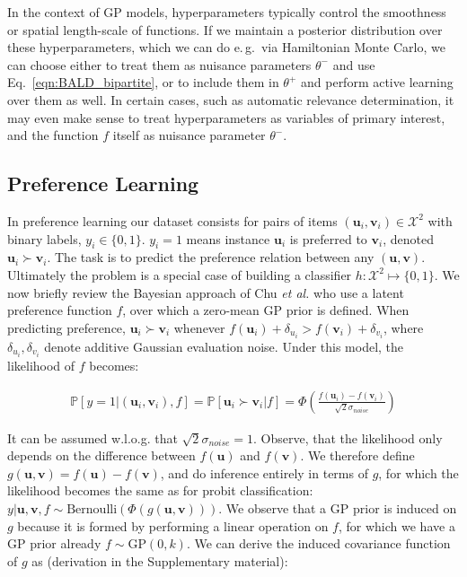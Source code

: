 \documentclass{article}
\newcommand{\upref}{\bm{u}}
\newcommand{\vpref}{\bm{v}}
\begin{document}
In the context of GP models, hyperparameters typically control the smoothness or spatial length-scale of functions. If we maintain a posterior distribution over these hyperparameters, which we can do e.\,g.\ via Hamiltonian Monte Carlo, we can choose either to treat them as nuisance parameters $\theta^-$ and use Eq.\ \ref{eqn:BALD_bipartite}, or to include them in $\theta^+$ and perform active learning over them as well. In certain cases, such as automatic relevance determination\cite{Rasmussen2006}, it may even make sense to treat hyperparameters as variables of primary interest, and the function $f$ itself as nuisance parameter $\theta^-$.

\subsection{Preference Learning}

In preference learning our dataset consists for pairs of items $(\upref_i,\vpref_i)\in\mathcal{X}^2$ with binary labels, $y_i\in\{0,1\}$. $y_i=1$ means instance $\upref_i$ is preferred to $\vpref_i$, denoted $\upref_i\succ \vpref_i$. The task is to predict the preference relation between any $(\upref,\vpref)$. Ultimately the problem is a special case of building a classifier $h:\mathcal{X}^2\mapsto\{0,1\}$. We now briefly review the Bayesian approach of Chu \emph{et al.} \cite{chu2005} who use a latent preference function $f$, over which a zero-mean GP prior is defined. When predicting preference,  $\upref_i \succ \vpref_i$ whenever $f(\upref_i)+\delta_{u_i}>f(\vpref_i)+\delta_{v_i}$, where $\delta_{u_i}, \delta_{v_i}$ denote additive Gaussian evaluation noise. Under this model, the likelihood of $f$ becomes:

\begin{align}
	\mathbb{P}[y=1\vert (\upref_i,\vpref_i), f] = \mathbb{P}[\upref_i\succ \vpref_i \vert f] =  \Phi\left(\frac{f(\upref_i) - f(\vpref_i)}{\sqrt{2}\sigma_{noise}}\right)
\end{align}

It can be assumed w.l.o.g. that $\sqrt{2}\sigma_{noise}=1$. Observe, that the likelihood only depends on the difference between $f(\upref)$ and $f(\vpref)$. We therefore define $g(\upref,\vpref)=f(\upref)-f(\vpref)$, and do inference entirely in terms of $g$, for which the likelihood becomes the same as for probit classification: $y|\upref,\vpref,f\sim \mathrm{Bernoulli}(\Phi(g(\upref,\vpref)))$. We observe that a GP prior is induced on $g$ because it is formed by performing a linear operation on $f$, for which we have a GP prior already $f\sim \mathrm{GP}(0,k)$. We can derive the induced covariance function of $g$ as (derivation in the Supplementary material):
\end{document}
